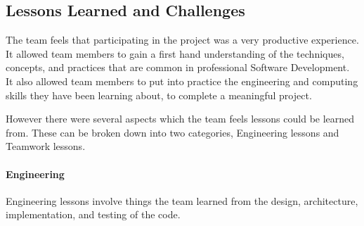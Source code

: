 \documentclass[11pt]{article}
\begin{document}
\pagebreak
\subsection{Lessons Learned and Challenges}

The team feels that participating in the project was a very productive experience. It allowed team members to gain a first hand understanding of the techniques, concepts, and practices that are common in professional Software Development. It also allowed team members to put into practice the engineering and computing skills they have been learning about, to complete a meaningful project. 

However there were several aspects which the team feels lessons could be learned from.
These can be broken down into two categories, Engineering lessons and Teamwork lessons.

\paragraph{Engineering}

Engineering lessons involve things the team learned from the design, architecture, implementation, and testing of the code.
\end{document}
